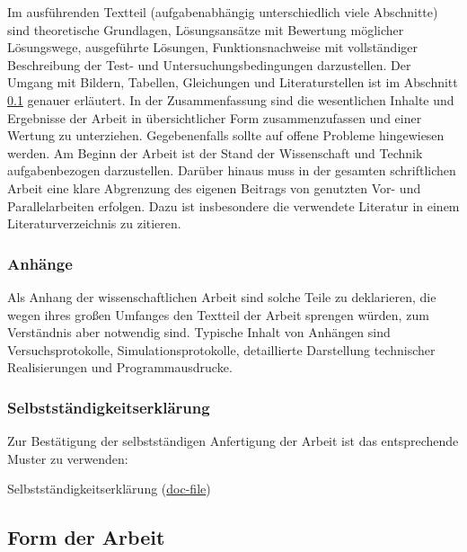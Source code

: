 Im ausführenden Textteil (aufgabenabhängig unterschiedlich viele Abschnitte) sind theoretische Grundlagen, Lösungsansätze mit Bewertung möglicher Lösungswege, ausgeführte Lösungen, Funktionsnachweise mit vollständiger Beschreibung der Test- und Untersuchungsbedingungen darzustellen.
Der Umgang mit Bildern, Tabellen, Gleichungen und Literaturstellen ist im Abschnitt \ref{sec:FormDerArbeit} genauer erläutert.
In der Zusammenfassung sind die wesentlichen Inhalte und Ergebnisse der Arbeit in übersichtlicher Form zusammenzufassen und einer Wertung zu unterziehen. Gegebenenfalls sollte auf offene Probleme hingewiesen werden.
Am Beginn der Arbeit ist der Stand der Wissenschaft und Technik aufgabenbezogen darzustellen. Darüber hinaus muss in der gesamten schriftlichen Arbeit eine klare Abgrenzung des eigenen Beitrags von genutzten Vor- und Parallelarbeiten erfolgen. Dazu ist insbesondere die verwendete Literatur in einem Literaturverzeichnis zu zitieren.


\subsubsection{Anhänge}
\label{sec:Anhänge}

Als Anhang der wissenschaftlichen Arbeit sind solche Teile zu deklarieren, die wegen ihres großen Umfanges den Textteil der Arbeit sprengen würden, zum Verständnis aber notwendig sind. Typische Inhalt von Anhängen sind Versuchsprotokolle, Simulationsprotokolle, detaillierte Darstellung technischer Realisierungen und Programmausdrucke.

\subsubsection{Selbstständigkeitserklärung}
\label{sec:Selbstständigkeitserklärung}

Zur Bestätigung der selbstständigen Anfertigung der Arbeit ist das entsprechende Muster zu verwenden:
\begin{compactitem}
  \item Selbstständigkeitserklärung (\href{http://www.et.tu-dresden.de/ifa/fileadmin/user_upload/www_files/richtlinien_sa_da/DA-SA_Selbststaendigkeit.doc}{doc-file})
\end{compactitem}


\subsection{Form der Arbeit}
\label{sec:FormDerArbeit}

